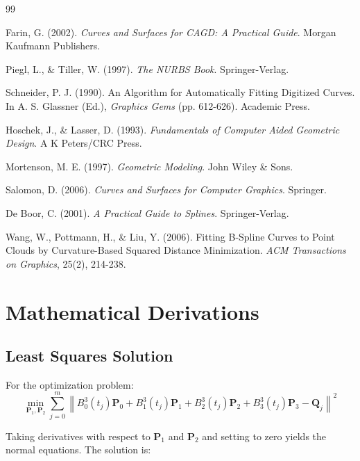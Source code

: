 \documentclass[12pt,a4paper]{article}
\begin{document}
\begin{thebibliography}{99}

Farin, G. (2002). \textit{Curves and Surfaces for CAGD: A Practical Guide}. Morgan Kaufmann Publishers.

Piegl, L., \& Tiller, W. (1997). \textit{The NURBS Book}. Springer-Verlag.

Schneider, P. J. (1990). An Algorithm for Automatically Fitting Digitized Curves. In A. S. Glassner (Ed.), \textit{Graphics Gems} (pp. 612-626). Academic Press.

Hoschek, J., \& Lasser, D. (1993). \textit{Fundamentals of Computer Aided Geometric Design}. A K Peters/CRC Press.

Mortenson, M. E. (1997). \textit{Geometric Modeling}. John Wiley \& Sons.

Salomon, D. (2006). \textit{Curves and Surfaces for Computer Graphics}. Springer.

De Boor, C. (2001). \textit{A Practical Guide to Splines}. Springer-Verlag.

Wang, W., Pottmann, H., \& Liu, Y. (2006). Fitting B-Spline Curves to Point Clouds by Curvature-Based Squared Distance Minimization. \textit{ACM Transactions on Graphics}, 25(2), 214-238.

\end{thebibliography}

\appendix

\section{Mathematical Derivations}

\subsection{Least Squares Solution}

For the optimization problem:
\begin{equation}
\min_{\mathbf{P}_1, \mathbf{P}_2} \sum_{j=0}^{m} \left\|B_0^3(t_j)\mathbf{P}_0 + B_1^3(t_j)\mathbf{P}_1 + B_2^3(t_j)\mathbf{P}_2 + B_3^3(t_j)\mathbf{P}_3 - \mathbf{Q}_j\right\|^2
\end{equation}

Taking derivatives with respect to $\mathbf{P}_1$ and $\mathbf{P}_2$ and setting to zero yields the normal equations. The solution is:
\end{document}
